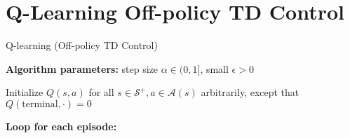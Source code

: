 \documentclass[../xlapes02]{subfiles}
\begin{document}
    \section{Q-Learning Off-policy TD Control}
    \begin{algorithm}[h!]
        \caption{Q-learning (Off-policy TD Control)}
        \label{alg:q_learning}

        \textbf{Algorithm parameters:} step size $\alpha \in (0, 1]$, small $\epsilon > 0$

        Initialize $Q(s, a)$ for all $s \in \mathcal{S}^+, a \in \mathcal{A}(s)$ arbitrarily, except that $Q(\text{terminal}, \cdot) = 0$

        \textbf{Loop for each episode:}
    \end{algorithm}

%
%
%
%
%
%
%
\end{document}
